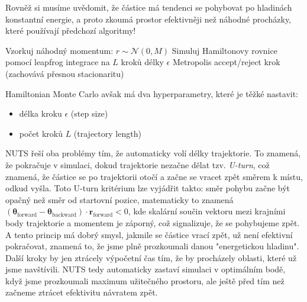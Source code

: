 Rovněž si musíme uvědomit, že částice má tendenci se pohybovat po hladinách konstantní energie, a proto zkoumá prostor efektivněji než náhodné procházky, které používají předchozí algoritmy!

\begin{algorithm}
\caption{Hamiltonian Monte Carlo }
\begin{algorithmic}[1]
\State Vzorkuj náhodný momentum: $r \sim \mathcal{N}(0, M)$
\State Simuluj Hamiltonovy rovnice pomocí leapfrog integrace na $L$ kroků délky $\epsilon$
\State Metropolis accept/reject krok (zachovává přesnou stacionaritu)
\end{algorithmic}
\end{algorithm}

Hamiltonian Monte Carlo avšak má dva hyperparametry, které je těžké nastavit:
\begin{itemize}
    \item délka kroku $\epsilon$ (step size)
    \item počet kroků $L$ (trajectory length)
\end{itemize}

NUTS řeší oba problémy tím, že automaticky volí délky trajektorie.
To znamená, že pokračuje v simulaci, dokud trajektorie nezačne dělat tzv. \textit{U-turn}, což znamená, že částice se po trajektorii otočí a začne se vracet zpět směrem k místu, odkud vyšla.
Toto U-turn kritérium lze vyjádřit takto: směr pohybu začne být opačný než směr od startovní pozice, matematicky to znamená $(\boldsymbol{\theta}_{\text{forward}} - \boldsymbol{\theta}_{\text{backward}}) \cdot \mathbf{r}_{\text{forward}} < 0$, kde skalární součin vektoru mezi krajními body trajektorie a momentem je záporný, což signalizuje, že se pohybujeme zpět.
A tento princip má dobrý smysl, jakmile se částice vrací zpět, už není efektivní pokračovat, znamená to, že jsme plně prozkoumali danou "energetickou hladinu".
Další kroky by jen ztrácely výpočetní čas tím, že by procházely oblasti, které už jsme navštívili. 
NUTS tedy automaticky zastaví simulaci v optimálním bodě, když jsme prozkoumali maximum užitečného prostoru, ale ještě před tím než začneme ztrácet efektivitu návratem zpět.


